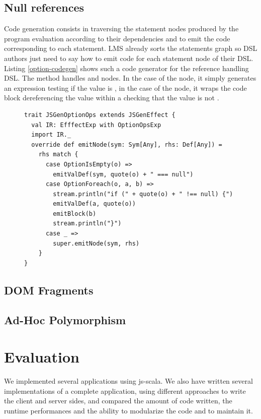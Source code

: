 \documentclass[preprint]{sigplanconf}
\begin{document}
\subsection{Null references}

Code generation consists in traversing the statement nodes produced by the program evaluation according to their
dependencies and to emit the code corresponding to each statement. LMS already sorts the statements graph so DSL
authors just need to say how to emit code for each statement node of their DSL. Listing \ref{option-codegen} shows
such a code generator for the  reference handling DSL. The  method handles
 and  nodes. In the case of the  node, it simply
generates an expression testing if the value is , in the case of the  node, it wraps
the code block dereferencing the value within a  checking that the value is not .

\begin{figure}
\begin{lstlisting}[caption=Null reference handling DSL code generator,label=option-codegen]
trait JSGenOptionOps extends JSGenEffect {
  val IR: EfffectExp with OptionOpsExp
  import IR._
  override def emitNode(sym: Sym[Any], rhs: Def[Any]) =
    rhs match {
      case OptionIsEmpty(o) =>
        emitValDef(sym, quote(o) + " === null")
      case OptionForeach(o, a, b) =>
        stream.println("if (" + quote(o) + " !== null) {")
        emitValDef(a, quote(o))
        emitBlock(b)
        stream.println("}")
      case _ =>
        super.emitNode(sym, rhs)
    }
}
\end{lstlisting}
\end{figure}

\subsection{DOM Fragments}

\subsection{Ad-Hoc Polymorphism}

\section{Evaluation}
\label{validation}

We implemented several applications using js-scala. We also have written several implementations of a complete
application, using different approaches to write the client and server sides, and compared the amount of code
written, the runtime performances and the ability to modularize the code and to maintain it.
\end{document}
